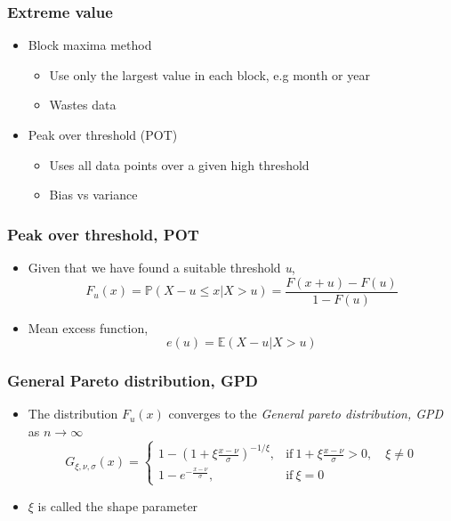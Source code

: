 \documentclass{beamer}
\begin{document}
\begin{frame}
\frametitle{Extreme value}
\begin{itemize}
	\item Block maxima method
	\begin{itemize}
		\item Use only the largest value in each block, e.g month or year
		\item Wastes data
	\end{itemize}
	\item Peak over threshold (POT)
		\begin{itemize}
			\item Uses all data points over a given high threshold
			\item Bias vs variance
		\end{itemize}
\end{itemize}
\end{frame}

\begin{frame}
\frametitle{Peak over threshold, POT}
\begin{itemize}
	\item Given that we have found a suitable threshold \textit{u},
	\begin{equation*}
	F_u(x) = \mathbb{P}(X - u \leq x | X > u) = \frac{F(x + u) - F(u)}{1 - F(u)}
	\label{excessdist}
	\end{equation*}
	\item Mean excess function,
	\begin{equation*}
	e(u) = \mathbb{E}(X - u | X > u)
	\label{mefunc}
	\end{equation*}
\end{itemize}
\end{frame}

\begin{frame}
\frametitle{General Pareto distribution, GPD}
\begin{itemize}
	\item The distribution $F_u(x)$ converges to the \textit{General pareto distribution, GPD} as $ n \rightarrow \infty$
	\begin{equation*}
	G_{\xi, \nu, \sigma}(x) =
	\begin{cases}
	1-(1+\xi \frac{x-\nu}{\sigma})^{-1/\xi}, & \text{if} \ 1+\xi \frac{x-\nu}{\sigma} > 0, \quad \xi \neq 0 \\
	1- e^{-\frac{x-\nu}{\sigma}}, & \text{if} \  \xi = 0
	\end{cases}
	\label{GPD}
	\end{equation*}
	\item $\xi$ is called the shape parameter
\end{itemize}
\end{frame}
\end{document}
